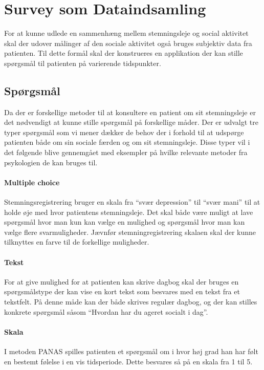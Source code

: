 \section{Survey som Dataindsamling}
For at kunne udlede en sammenhæng mellem stemningsleje og social aktivitet skal der udover målinger af den sociale aktivitet også bruges subjektiv data fra patienten.
Til dette formål skal der konstrueres en applikation der kan stille spørgsmål til patienten på varierende tidspunkter.

\subsection{Spørgsmål}
Da der er forskellige metoder til at konsultere en patient om sit stemningsleje er det nødvendigt at kunne stille spørgsmål på forskellige måder.
Der er udvalgt tre typer spørgsmål som vi mener dækker de behov der i forhold til at udspørge patienten både om sin sociale færden og om sit stemningsleje.
Disse typer vil i det følgende blive gennemgået med eksempler på hvilke relevante metoder fra psykologien de kan bruges til.

\paragraph{Multiple choice}
Stemningsregistrering  bruger en skala fra ``svær depression'' til ``svær mani'' til at holde øje med hvor patientens stemningsleje.
Det skal både være muligt at lave spørgsmål hvor man kun kan vælge en mulighed og spørgsmål hvor man kan vælge flere svarmuligheder.
Jævnfør stemningregistrering skalaen skal der kunne tilknyttes en farve til de forkellige muligheder.


\paragraph{Tekst}
For at give mulighed for at patienten kan skrive dagbog  skal der bruges en spørgsmålstype der kan vise en kort tekst som besvares med en tekst fra et tekstfelt.
På denne måde kan der både skrives regulær dagbog, og der kan stilles konkrete spørgsmål såsom ``Hvordan har du ageret socialt i dag''.

\paragraph{Skala}
I metoden PANAS spilles patienten et spørgsmål om i hvor høj grad han har følt en bestemt følelse i en vis tidsperiode.
Dette besvares så på en skala fra 1 til 5.

